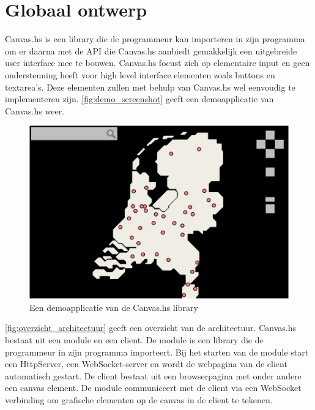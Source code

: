\section{Globaal ontwerp}  \label{sec:globaal}
Canvas.hs is een library die de programmeur kan importeren in zijn programma om er daarna met de API die Canvas.hs aanbiedt gemakkelijk een uitgebreide user interface mee te bouwen. Canvas.hs focust zich op elementaire input en geen ondersteuning heeft voor high level interface elementen zoals buttons en textarea's. Deze elementen zullen met behulp van Canvas.hs wel eenvoudig te implementeren zijn. \autoref{fig:demo_screenshot} geeft een demoapplicatie van Canvas.hs weer.


\begin{figure}[H]
\begin{center}
\includegraphics[keepaspectratio,width=\textwidth]{./images/demo.png}
\caption{Een demoapplicatie van de Canvas.hs library}
\label{fig:demo_screenshot}
\end{center}
\end{figure}


\autoref{fig:overzicht_architectuur} geeft een overzicht van de architectuur. Canvas.hs bestaat uit een module en een client. De module is een library die de programmeur in zijn programma importeert. Bij het starten van de module start een HttpServer, een WebSocket-server en wordt de webpagina van de client automatisch gestart. De client bestaat uit een browserpagina met onder andere een canvas element. De module communiceert met de client via een WebSocket verbinding om grafische elementen op de canvas in de client te tekenen.

